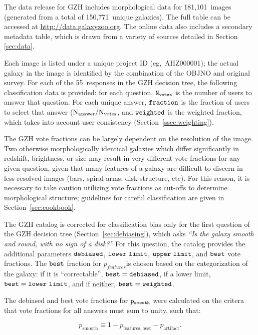\documentclass[twocolumn]{aastex6}
\begin{document}
The data release for GZH includes morphological data for 181,101~images (generated from a total of 150,771~unique galaxies). The full table can be accessed at \url{http://data.galaxyzoo.org}. The online data also includes a secondary metadata table, which is drawn from a variety of sources detailed in Section \ref{sec:data}.

Each image is listed under a unique project ID (eg,~AHZ000001); the actual galaxy in the image is identified by the combination of the OBJNO and original survey. For each of the 55~responses in the GZH decision tree, the following classification data is provided: for each question, $\tt N_{votes}$ is the number of users to answer that question. For each unique answer, $\tt fraction$ is the fraction of users to select that answer ($\rm N_{answer}/N_{votes}$, and $\tt weighted$ is the weighted fraction, which takes into account user consistency (Section~\ref{ssec:weighting}). 

The GZH vote fractions can be largely dependent on the resolution of the image. Two otherwise morphologically identical galaxies which differ significantly in redshift, brightness, or size may result in very different vote fractions for any given question, given that many features of a galaxy are difficult to discern in less-resolved images (bars, spiral arms, disk structure, etc). For this reason, it is necessary to take caution utilizing vote fractions as cut-offs to determine morphological structure; guidelines for careful classification are given in Section~\ref{sec:cookbook}. 

The GZH catalog is corrected for classification bias only for the first question of the GZH decision tree (Section~\ref{sec:debiasing}), which asks {\it ``Is the galaxy smooth and round, with no sign of a disk?''} For this question, the catalog provides the additional parameters $\tt debiased$, $\tt lower~limit$, $\tt upper~limit$, and $\tt best$ vote fractions. The $\tt best$ fraction for $p_{features}$is chosen based on the categorization of the galaxy: if it is ``correctable'', $\tt best = debiased$, if a lower limit, $\tt best = lower~limit$, and if neither, $\tt best = weighted$. 

The debiased and best vote fractions for $\tt p_{smooth}$ were calculated on the critera that vote fractions for all answers must sum to unity, such that:

\begin{equation}
p_\mathrm{smooth} \equiv 1 - p_\mathrm{features,best} - p_\mathrm{artifact}.
\label{eqn:nonlinear}
\end{equation}
\end{document}
